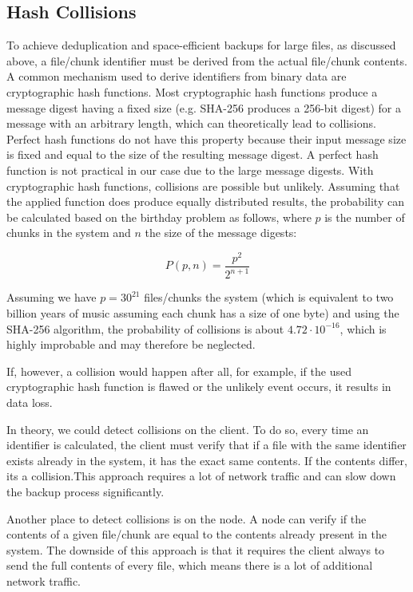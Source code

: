 \subsection{Hash Collisions}\label{sec:hash-collisions}
To achieve deduplication and space-efficient backups for large files, as discussed above, a file/chunk identifier must be derived from the actual file/chunk contents. 
A common mechanism used to derive identifiers from binary data are cryptographic hash functions. Most cryptographic hash functions produce a message digest having a fixed size (e.g. SHA-256\cite{sha-256} produces a 256-bit digest) for a message with an arbitrary length, which can theoretically lead to collisions.
Perfect hash functions do not have this property because their input message size is fixed and equal to the size of the resulting message digest. A perfect hash function is not practical in our case due to the large message digests.
With cryptographic hash functions, collisions are possible but unlikely. Assuming that the applied function does produce equally distributed results, the probability can be calculated based on the birthday problem\cite{birthday-attack} as follows, where $p$ is the number of chunks in the system and $n$ the size of the message digests:

\[
P(p, n) = \frac{p^2}{2^{n+1}}
\]

Assuming we have $p=30^{21}$ files/chunks the system (which is equivalent to two billion years of music assuming each chunk has a size of one byte\cite{seagate-zetabyte}) and using the SHA-256 algorithm, the probability of collisions is about $4.72 \cdot 10^{-16}$, which is highly improbable and may therefore be neglected.

If, however, a collision would happen after all, for example, if the used cryptographic hash function is flawed or the unlikely event occurs, it results in data loss.

In theory, we could detect collisions on the client. To do so, every time an identifier is calculated, the client must verify that if a file with the same identifier exists already in the system, it has the exact same contents. If the contents differ, its a collision.This approach requires a lot of network traffic and can slow down the backup process significantly.

Another place to detect collisions is on the node. A node can verify if the contents of a given file/chunk are equal to the contents already present in the system. The downside of this approach is that it requires the client always to send the full contents of every file, which means there is a lot of additional network traffic.

